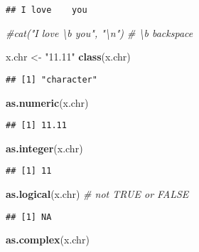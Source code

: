 \documentclass[
  12pt,
]{article}
\newenvironment{Shaded}{\begin{snugshade}}{\end{snugshade}}
\newcommand{\CommentTok}[1]{\textcolor[rgb]{0.56,0.35,0.01}{\textit{#1}}}
\newcommand{\FunctionTok}[1]{\textcolor[rgb]{0.13,0.29,0.53}{\textbf{#1}}}
\newcommand{\NormalTok}[1]{#1}
\newcommand{\OtherTok}[1]{\textcolor[rgb]{0.56,0.35,0.01}{#1}}
\newcommand{\StringTok}[1]{\textcolor[rgb]{0.31,0.60,0.02}{#1}}
\begin{document}
\begin{verbatim}
## I love    you
\end{verbatim}

\begin{Shaded}
\begin{Highlighting}[]
\CommentTok{\#cat("I love \textbackslash{}b you", "\textbackslash{}n")  \# \textquotesingle{}\textbackslash{}b\textquotesingle{} backspace}
\end{Highlighting}
\end{Shaded}

\begin{Shaded}
\begin{Highlighting}[]
\NormalTok{x.chr }\OtherTok{\textless{}{-}} \StringTok{"11.11"}
\FunctionTok{class}\NormalTok{(x.chr)}
\end{Highlighting}
\end{Shaded}

\begin{verbatim}
## [1] "character"
\end{verbatim}

\begin{Shaded}
\begin{Highlighting}[]
\FunctionTok{as.numeric}\NormalTok{(x.chr)}
\end{Highlighting}
\end{Shaded}

\begin{verbatim}
## [1] 11.11
\end{verbatim}

\begin{Shaded}
\begin{Highlighting}[]
\FunctionTok{as.integer}\NormalTok{(x.chr)}
\end{Highlighting}
\end{Shaded}

\begin{verbatim}
## [1] 11
\end{verbatim}

\begin{Shaded}
\begin{Highlighting}[]
\FunctionTok{as.logical}\NormalTok{(x.chr)  }\CommentTok{\# not TRUE or FALSE}
\end{Highlighting}
\end{Shaded}

\begin{verbatim}
## [1] NA
\end{verbatim}

\begin{Shaded}
\begin{Highlighting}[]
\FunctionTok{as.complex}\NormalTok{(x.chr)}
\end{Highlighting}
\end{Shaded}
\end{document}
